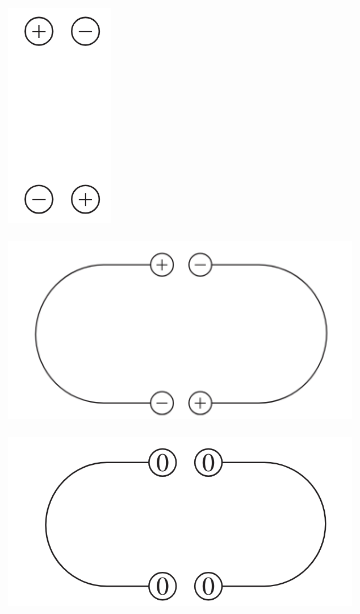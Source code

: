 \documentclass[english,a4paper,12pt]{report}
\begin{document}
\begin{figure}[htbp]
    \centering
    
    \begin{subfigure}[b]{0.35\textwidth}
        \centering
        \includegraphics[width=0.3\textwidth]{uni1}
        \caption[]{\label{uni1}}
    \end{subfigure}
    \hfill
    \begin{subfigure}[b]{0.4\textwidth}
        \centering
        \includegraphics[width=\textwidth]{uni2}	
        \caption[]{\label{uni2}}
    \end{subfigure}
    
    \begin{subfigure}[b]{0.4\textwidth}
        \centering
        \includegraphics[width=\textwidth]{uni3}	
        \caption[]{\label{uni3}}
    \end{subfigure}
    
    \caption[]{\label{uni}}
\end{figure}
\end{document}
